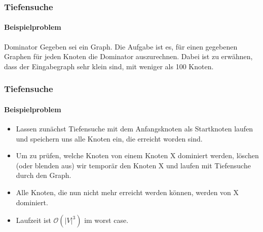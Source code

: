 \begin{frame}
	\frametitle{Tiefensuche}
	\framesubtitle{Beispielproblem}
		\begin{KITexampleblock}{Dominator}
			Gegeben sei ein Graph. Die Aufgabe ist es, für einen gegebenen Graphen für jeden Knoten die Dominator auszurechnen. Dabei ist zu erwähnen, dass der Eingabegraph sehr klein sind, mit weniger als 100 Knoten.
		\end{KITexampleblock}
\end{frame}

\begin{frame}
	\frametitle{Tiefensuche}
	\framesubtitle{Beispielproblem}
		\begin{itemize}
			\item Lassen zunächst Tiefensuche mit dem Anfangsknoten als Startknoten laufen und speichern uns alle Knoten ein, die erreicht worden sind.
			\pause
			\bigskip
			\item Um zu prüfen, welche Knoten von einem Knoten X dominiert werden, löschen (oder blenden aus) wir temporär den Knoten X und laufen mit Tiefensuche durch den Graph.
						\pause
						\bigskip
			\item Alle Knoten, die nun nicht mehr erreicht werden können, werden von X dominiert.
						\pause
						\bigskip
			\item Laufzeit ist $\mathcal{O}(|V|^3)$ im worst case.
		\end{itemize}
\end{frame}
